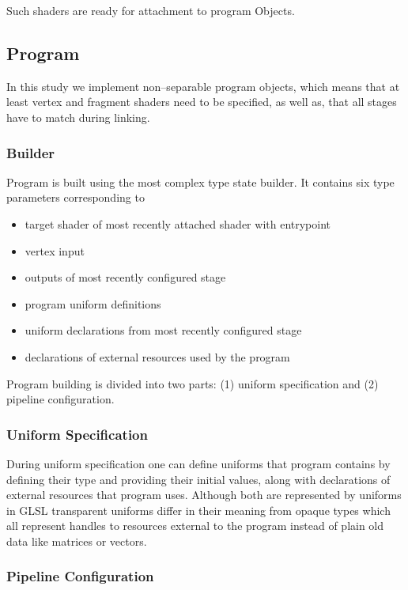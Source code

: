 Such shaders are ready for attachment to program Objects.

\subsection{Program}

In this study we implement non--separable program objects, which means that at least vertex and fragment shaders need to be specified, as well as, that all stages have to match during linking.

\subsubsection{Builder}

Program is built using the most complex type state builder. It contains six type parameters corresponding to
\begin{itemize}
    \item target shader of most recently attached shader with entrypoint
    \item vertex input
    \item outputs of most recently configured stage
    \item program uniform definitions
    \item uniform declarations from most recently configured stage
    \item declarations of external resources used by the program
\end{itemize}

Program building is divided into two parts: (1) uniform specification and (2) pipeline configuration.


\subsubsection{Uniform Specification}

During uniform specification one can define uniforms that program contains by defining their type and providing their initial values, along with declarations of external resources that program uses.
Although both are represented by uniforms in GLSL transparent uniforms differ in their meaning from opaque types which all represent handles to resources external to the program
instead of plain old data like matrices or vectors.

\subsubsection{Pipeline Configuration}

